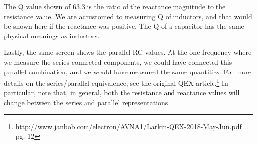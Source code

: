 The Q value shown of 63.3 is the ratio of the reactance magnitude to the resistance value.  We are accustomed to measuring Q of inductors, and that would be shown here if the reactance was positive.  The Q of a capacitor has the same physical meanings as inductors.

Lastly, the same screen shows the parallel RC values. At the one frequency where we measure the series connected components, we could have connected this parallel combination, and we would have measured the same quantities.
For more details on the series/parallel equivalence, see the original QEX article.\footnote{http://www.janbob.com/electron/AVNA1/Larkin-QEX-2018-May-Jun.pdf pg. 12}
%
In particular, note that, in general, both the resistance and reactance values will change between the series and parallel representations.

